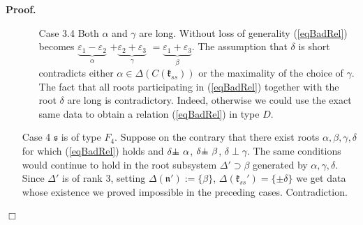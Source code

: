 \documentclass[12pt]{report}
\newenvironment{proof}[1][]{ \textbf{Proof#1. }}{$\Box$\medskip}
\newcommand{\sS}{\mathfrak{s}}
\newcommand{\kk}{\mathfrak{k}}
\newcommand{\nn}{\mathfrak{n}}
\newcommand{\refeq}[1]{(\ref{#1})}
\newcommand{\eps}{\varepsilon}
\def\sperp{{\hbox{$\perp${\hbox{\kern -.77em $-$}\raise-1pt\hbox{\kern -.77em $-$}}\ }}}
\newcommand{\pma}{\pm}%
\begin{document}
\begin{proof}
\begin{itemize}
\begin{itemize}
\item[Case 3.4] Both $\alpha$ and $\gamma$ are long. Without loss of generality \refeq{eqBadRel} becomes
$\underbrace{ \eps_{1}- \eps_{2}}_{\alpha}$ $+\underbrace{ \eps_{2} +\eps_{3}}_{\gamma}$ $= \underbrace{\eps_{1} +\eps_{3}}_{\beta}$. The assumption that $\delta$ is short contradicts either $\alpha\in \Delta(C(\kk_{ss}))$ or the maximality of the choice of $\gamma$. The fact that all roots participating in \refeq{eqBadRel} together with the root $\delta$ are long is contradictory. Indeed, otherwise we could use the exact same data to obtain a relation (\ref{eqBadRel}) in type $D$.
\end{itemize}
\item[Case 4] $\sS$ is of type $F_4$. Suppose on the contrary that there exist roots $\alpha,\beta,\gamma,\delta$ for which \refeq{eqBadRel} holds and $\delta\sperp\alpha$, $\delta\sperp\beta$, $\delta\perp\gamma$. The same conditions would continue to hold in the root subsystem $\Delta '\supset \beta$ generated by $\alpha, \gamma, \delta $. Since $\Delta'$ is of rank 3, setting $\Delta(\nn'):=\{\beta\}$, $\Delta(\kk_{ss}') =\{\pma\delta\}$ we get data whose existence we proved impossible in the preceding cases. Contradiction.
\end{itemize}
\end{proof}
\end{document}

